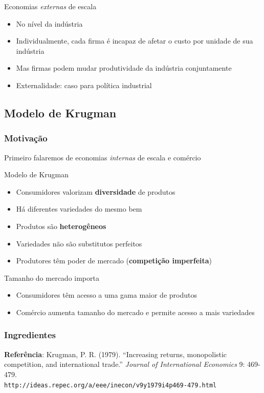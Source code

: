 \documentclass[a4paper,12pt]{article}[abntex2]
\begin{document}
Economias \textit{externas} de escala
\begin{itemize}
    \item No nível da indústria
    \item Individualmente, cada firma é incapaz de afetar o custo por unidade de sua indústria
    \item Mas firmas podem mudar produtividade da indústria conjuntamente
    \item Externalidade: caso para política industrial
\end{itemize}

\subsection{\textbf{Modelo de Krugman}}
\subsubsection{\textbf{Motivação}}
Primeiro falaremos de economias \textit{internas} de escala e comércio

Modelo de Krugman
\begin{itemize}
    \item Consumidores valorizam \textbf{diversidade} de produtos
    \item Há diferentes variedades do mesmo bem
    \item Produtos são \textbf{heterogêneos}
    \item Variedades não são substitutos perfeitos
    \item Produtores têm poder de mercado (\textbf{competição imperfeita})
\end{itemize}

Tamanho do mercado importa
\begin{itemize}
    \item Consumidores têm acesso a uma gama maior de produtos
    \item Comércio aumenta tamanho do mercado e permite acesso a mais variedades
\end{itemize}

\subsubsection{\textbf{Ingredientes}}

\textbf{Referência}: Krugman, P. R. (1979). “Increasing returns, monopolistic competition, and international trade.” \textit{Journal of International Economics} 9: 469-479.\\
\texttt{http://ideas.repec.org/a/eee/inecon/v9y1979i4p469-479.html}
\end{document}
